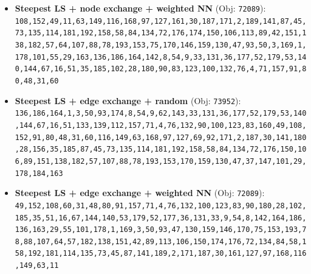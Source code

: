 \begin{itemize}[leftmargin=1.5em]
    \item \textbf{Steepest LS + node exchange + weighted NN} (Obj: \texttt{72089}):\\
    \texttt{108,152,49,11,63,149,116,168,97,127,161,30,187,171,2,189,141,87,45,73,135,114,181,192,158,58,84,134,72,176,174,150,106,113,89,42,151,138,182,57,64,107,88,78,193,153,75,170,146,159,130,47,93,50,3,169,1,178,101,55,29,163,136,186,164,142,8,54,9,33,131,36,177,52,179,53,140,144,67,16,51,35,185,102,28,180,90,83,123,100,132,76,4,71,157,91,80,48,31,60}
    \item \textbf{Steepest LS + edge exchange + random} (Obj: \texttt{73952}):\\
    \texttt{136,186,164,1,3,50,93,174,8,54,9,62,143,33,131,36,177,52,179,53,140,144,67,16,51,133,139,112,157,71,4,76,132,90,100,123,83,160,49,108,152,91,80,48,31,60,116,149,63,168,97,127,69,92,171,2,187,30,141,180,28,156,35,185,87,45,73,135,114,181,192,158,58,84,134,72,176,150,106,89,151,138,182,57,107,88,78,193,153,170,159,130,47,37,147,101,29,178,184,163}
    \item \textbf{Steepest LS + edge exchange + weighted NN} (Obj: \texttt{72089}):\\
    \texttt{49,152,108,60,31,48,80,91,157,71,4,76,132,100,123,83,90,180,28,102,185,35,51,16,67,144,140,53,179,52,177,36,131,33,9,54,8,142,164,186,136,163,29,55,101,178,1,169,3,50,93,47,130,159,146,170,75,153,193,78,88,107,64,57,182,138,151,42,89,113,106,150,174,176,72,134,84,58,158,192,181,114,135,73,45,87,141,189,2,171,187,30,161,127,97,168,116,149,63,11}
\end{itemize}

